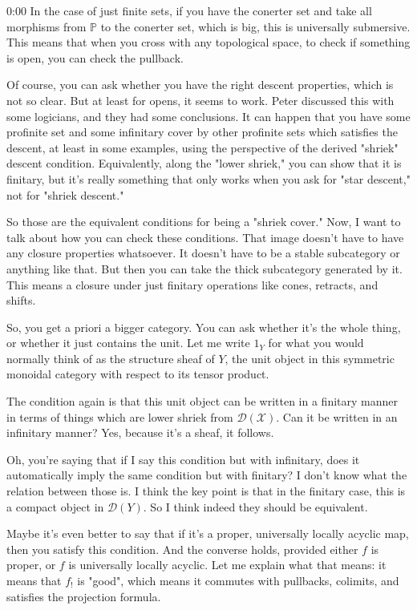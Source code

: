 \begin{unfinished}{0:00}
In the case of just finite sets, if you have the conerter set and take all morphisms from $\mathbb{P}$ to the conerter set, which is big, this is universally submersive. This means that when you cross with any topological space, to check if something is open, you can check the pullback.

Of course, you can ask whether you have the right descent properties, which is not so clear. But at least for opens, it seems to work. Peter discussed this with some logicians, and they had some conclusions. It can happen that you have some profinite set and some infinitary cover by other profinite sets which satisfies the descent, at least in some examples, using the perspective of the derived "shriek" descent condition. Equivalently, along the "lower shriek," you can show that it is finitary, but it's really something that only works when you ask for "star descent," not for "shriek descent."

So those are the equivalent conditions for being a "shriek cover." Now, I want to talk about how you can check these conditions.
That image doesn't have to have any closure properties whatsoever. It doesn't have to be a stable subcategory or anything like that. But then you can take the thick subcategory generated by it. This means a closure under just finitary operations like cones, retracts, and shifts.

So, you get a priori a bigger category. You can ask whether it's the whole thing, or whether it just contains the unit. Let me write $1_Y$ for what you would normally think of as the structure sheaf of $Y$, the unit object in this symmetric monoidal category with respect to its tensor product.

The condition again is that this unit object can be written in a finitary manner in terms of things which are lower shriek from $\mathcal{D}(\mathcal{X})$. Can it be written in an infinitary manner? Yes, because it's a sheaf, it follows.

Oh, you're saying that if I say this condition but with infinitary, does it automatically imply the same condition but with finitary? I don't know what the relation between those is. I think the key point is that in the finitary case, this is a compact object in $\mathcal{D}(Y)$. So I think indeed they should be equivalent.

Maybe it's even better to say that if it's a proper, universally locally acyclic map, then you satisfy this condition. And the converse holds, provided either $f$ is proper, or $f$ is universally locally acyclic. Let me explain what that means: it means that $f_!$ is "good", which means it commutes with pullbacks, colimits, and satisfies the projection formula.


\end{unfinished}
